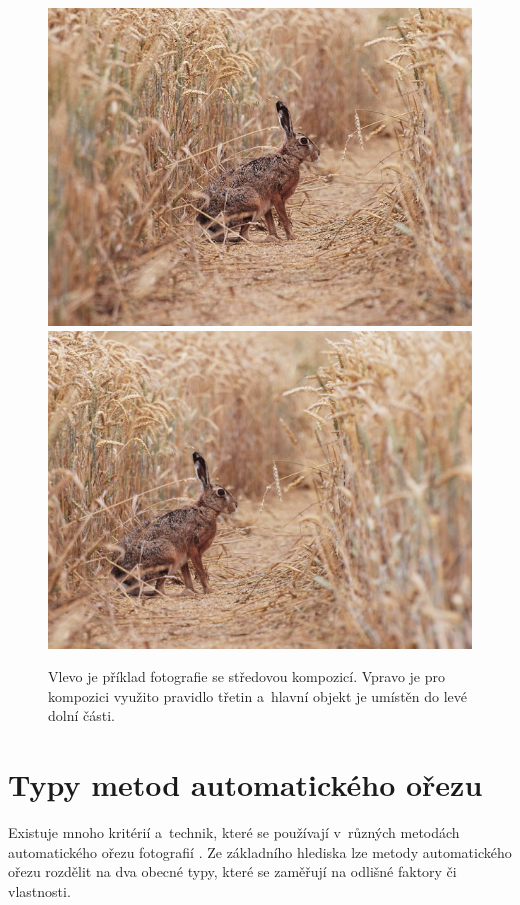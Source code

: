 \begin{figure}[H]
  \centering
  \includegraphics[scale=1.0]{obrazky/zajic-stred.jpg} \qquad
  \includegraphics[scale=1.0]{obrazky/zajic-tretiny.jpg}
  \caption{Vlevo je příklad fotografie se středovou kompozicí. Vpravo je pro kompozici využito pravidlo třetin a~hlavní objekt je umístěn do levé dolní části.}
  \label{obr:kompozice}
\end{figure}


\section{Typy metod automatického ořezu} \label{section:typymetod}
Existuje mnoho kritérií a~technik, které se používají v~různých metodách automatického ořezu fotografií \cite{Yan2013}. Ze základního hlediska lze metody automatického ořezu rozdělit na dva obecné typy, které se zaměřují na odlišné faktory či vlastnosti.

